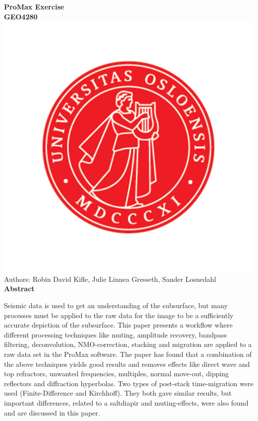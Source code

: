 \documentclass[10pt,a4paper]{article}
\begin{document}
\begin{center}
{\LARGE\bf ProMax Exercise\\GEO4280}
\\

\includegraphics[scale=0.1]{UiO.jpg}\\


Authors: Robin David Kifle, Julie Linnea Gresseth, Sander Losnedahl
\\
{\large\bf Abstract}
\end{center}

\noindent Seismic data is used to get an understanding of the subsurface, but many processes must be applied to the raw data for the image to be a sufficiently accurate depiction of the subsurface. This paper presents a workflow where different processing techniques like muting, amplitude recovery, bandpass filtering, deconvolution, NMO-correction, stacking and migration are applied to a raw data set in the ProMax software. The paper has found that a combination of the above techniques yields good results and removes effects like direct wave and top refractors, unwanted frequencies, multiples, normal move-out, dipping reflectors and diffraction hyperbolas. Two types of post-stack time-migration were used (Finite-Difference and Kirchhoff). They both gave similar results, but important differences, related to a saltdiapir and muting-effects, were also found and are discussed in this paper.
\end{document}
